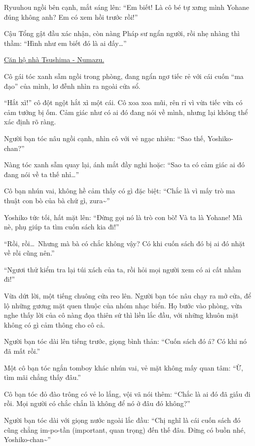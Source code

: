 \documentclass[../main.tex]{subfiles}
\begin{document}
Ryuuhou ngồi bên cạnh, mắt sáng lên: ``Em biết! Là cô bé tự xưng mình Yohane đúng không anh? Em có xem hồi trước rồi!''

Cậu Tổng gật đầu xác nhận, còn nàng Pháp sư ngẩn người, rồi nhẹ nhàng thì thầm: ``Hình như em biết đó là ai đấy\dots''

\begin{center}
  \uline{Căn hộ nhà Tsushima - Numazu.}
\end{center}

Cô gái tóc xanh sẫm ngồi trong phòng, đang ngẩn ngơ tiếc rẻ với cái cuốn ``ma đạo'' của mình, lơ đễnh nhìn ra ngoài cửa sổ.

``Hắt xì!'' cô đột ngột hắt xì một cái. Cô xoa xoa mũi, rên rỉ vì vừa tiếc vừa có cảm tưởng bị ốm. Cảm giác như có ai đó đang nói về mình, nhưng lại không thể xác định rõ ràng.

Người bạn tóc nâu ngồi cạnh, nhìn cô với vẻ ngạc nhiên: ``Sao thế, Yoshiko-chan?''

Nàng tóc xanh sẫm quay lại, ánh mắt đầy nghi hoặc: ``Sao ta có cảm giác ai đó đang nói về ta thế nhỉ\dots''

Cô bạn nhún vai, không hề cảm thấy có gì đặc biệt: ``Chắc là vì mấy trò ma thuật con bò của bà chứ gì, zura\~{}''

Yoshiko tức tối, hất mặt lên: ``Đừng gọi nó là trò con bò! Và ta là Yohane! Mà nè, phụ giúp ta tìm cuốn sách kia đi!''

``Rồi, rồi\dots\ Nhưng mà bà có chắc không vậy? Có khi cuốn sách đó bị ai đó nhặt về rồi cũng nên.''

``Ngươi thử kiểm tra lại túi xách của ta, rồi hỏi mọi người xem có ai cất nhầm đi!''

Vừa dứt lời, một tiếng chuông cửa reo lên. Người bạn tóc nâu chạy ra mở cửa, để lộ những gương mặt quen thuộc của nhóm nhạc biển. Họ bước vào phòng, vừa nghe thấy lời của cô nàng đọa thiên sứ thì liền lắc đầu, với những khuôn mặt không có gì cảm thông cho cô cả.

Người bạn tóc dài lên tiếng trước, giọng bình thản: ``Cuốn sách đó á? Có khi nó đã mất rồi.''

Một cô bạn tóc ngắn tomboy khác nhún vai, vẻ mặt không mấy quan tâm: ``Ừ, tìm mãi chẳng thấy đâu.''

Cô bạn tóc đỏ đào trông có vẻ lo lắng, vội vã nói thêm: ``Chắc là ai đó đã giấu đi rồi. Mọi người có chắc chắn là không để nó ở đâu đó không?''

Người bạn tóc dài với giọng nước ngoài lắc đầu: ``Chị nghĩ là cái cuốn sách đó cũng chẳng im-po-tần (important, quan trọng) đến thế đâu. Đừng có buồn nhé, Yoshiko-chan\~{}''
\end{document}
